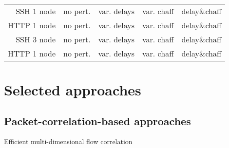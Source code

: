 \documentclass[conference]{IEEEtran}\usepackage[]{graphicx}\usepackage[]{color}
\begin{document}

\begin{tabular}{r|cccc}
SSH 1 node& no pert.&var. delays&var. chaff&delay\&chaff \\
HTTP 1 node& no pert.&var. delays&var. chaff&delay\&chaff \\
SSH 3 node& no pert.&var. delays&var. chaff&delay\&chaff \\
HTTP 1 node& no pert.&var. delays&var. chaff&delay\&chaff \\
\end{tabular}


 
\cite{sommer_outside_2010}





\section{Selected approaches}

\subsection{Packet-correlation-based approaches}

Efficient multi-dimensional flow correlation
\end{document}
